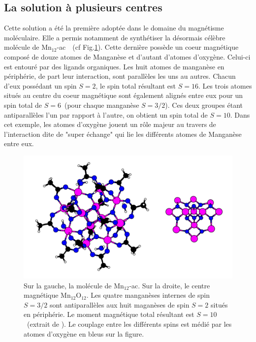 \subsection{La solution à plusieurs centres}
Cette solution a été la première adoptée dans le domaine du magnétisme moléculaire. Elle a permis notamment de synthétiser la désormais célèbre molécule de Mn$_{12}$-ac~\cite{Lis1980}~(cf Fig.\ref{Mn12}). Cette dernière possède un coeur magnétique composé de douze atomes de Manganèse et d'autant d'atomes d'oxygène. Celui-ci est entouré par des ligands organiques. Les huit atomes de manganèse en périphérie, de part leur interaction, sont parallèles les uns au autres. Chacun d'eux possédant un spin $S=2$, le spin total résultant est $S=16$. Les trois atomes situés au centre du coeur magnétique sont également alignés entre eux pour un spin total de $S=6$~(pour chaque manganèse $S=3/2$). Ces deux groupes étant antiparallèles l'un par rapport à l'autre, on obtient un spin total de $S=10$. Dans cet exemple, les atomes d'oxygène jouent un r\^ole majeur au travers de l'interaction dite de "super échange" qui lie les différents atomes de Manganèse entre eux.
\begin{figure}
\centering \includegraphics[scale=0.3]{Theorie/MagMol/figure1/Mn12.png} 
\caption{Sur la gauche, la molécule de Mn$_{12}$-ac. Sur la droite, le centre magnétique Mn$_{12}$O$_{12}$. Les quatre manganèses internes de spin $S=3/2$ sont antiparallèles aux huit maganèses de spin $S=2$ situés en périphérie. Le moment magnétique total résultant est $S=10$~(extrait de \cite{MagGoesNano}). Le couplage entre les différents spins est médié par les atomes d'oxygène en bleus sur la figure.}
\label{Mn12}
\end{figure}


